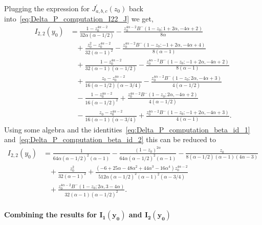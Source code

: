 Plugging the expression for $J_{a,b,c}^\prime(z_0)$ back into~\eqref{eq:Delta_P_computation_I22_J} we get,
\begin{align*}
	I_{2,2}(y_0) 
	&= \frac{1 -z_0^{4\alpha-2}}{32\alpha(\alpha-1/2)} 
		-  \frac{z_0^{4\alpha -2}B^-(1-z_0;1+2\alpha,-4\alpha+2)}{8\alpha} \\
	&\hspace{10pt}+ \frac{z_0^2 -z_0^{4\alpha-2}}{32(\alpha-1)^2}  
		- \frac{z_0^{4\alpha -2}B^-(1-z_0;-1+2\alpha,-4\alpha+4)}{8(\alpha-1)} \\
	&\hspace{10pt}+ \frac{1 -z_0^{4\alpha-2}}{32(\alpha-1)(\alpha-1/2)}  
		- \frac{z_0^{4\alpha -2}B^-(1-z_0;-1+2\alpha,-4\alpha+2)}{8(\alpha-1)} \\
	&\hspace{10pt}+ \frac{z_0 -z_0^{4\alpha-2}}{16(\alpha-1/2)(\alpha-3/4)}  
		- \frac{z_0^{4\alpha -2}B^-(1-z_0;2\alpha,-4\alpha+3)}{4(\alpha-1/2)} \\
	&\hspace{10pt}- \frac{1 -z_0^{4\alpha-2}}{16(\alpha-1/2)^2}  
		+ \frac{z_0^{4\alpha -2}B^-(1-z_0;2\alpha,-4\alpha+2)}{4(\alpha-1/2)}\\
	&\hspace{10pt}-\frac{z_0 -z_0^{4\alpha-2}}{16(\alpha-1)(\alpha-3/4)} 
		+ \frac{z_0^{4\alpha -2}B^-(1-z_0;-1+2\alpha,-4\alpha+3)}{4(\alpha-1)}.
\end{align*}
Using some algebra and the identities~\eqref{eq:Delta_P_computation_beta_id_1} and~\eqref{eq:Delta_P_computation_beta_id_2}  
this can be reduced to
\begin{equation}\label{eq:Delta_P_computation_I22}
\begin{aligned}
	I_{2,2}(y_0)
	&=\frac{1}{64\alpha(\alpha-1/2)^2(\alpha-1)} -\frac{(1 - z_0)^{2\alpha}}{64\alpha(\alpha-1/2)^2 (\alpha-1)} 
		- \frac{z_0}{8(\alpha-1/2)(\alpha-1)(4\alpha-3)}\\ 
	&\hspace{10pt}+ \frac{z_0^2}{32(\alpha-1)^2} + \frac{(-6 + 25\alpha - 48\alpha^2 + 44\alpha^3 -16\alpha^4) 
   		z_0^{4\alpha-2}}{512\alpha(\alpha-1/2)^2(\alpha-1)^2(\alpha-3/4)} \\
	&\hspace{10pt}+ \frac{z_0^{4\alpha-2}B^-(1 - z_0; 2\alpha, 3 - 4\alpha)}{32(\alpha-1)(\alpha-1/2)^2}.
\end{aligned}
\end{equation}



\paragraph{Combining the results for $\bm{I_1(y_0)}$ and $\bm{I_2(y_0)}$}



